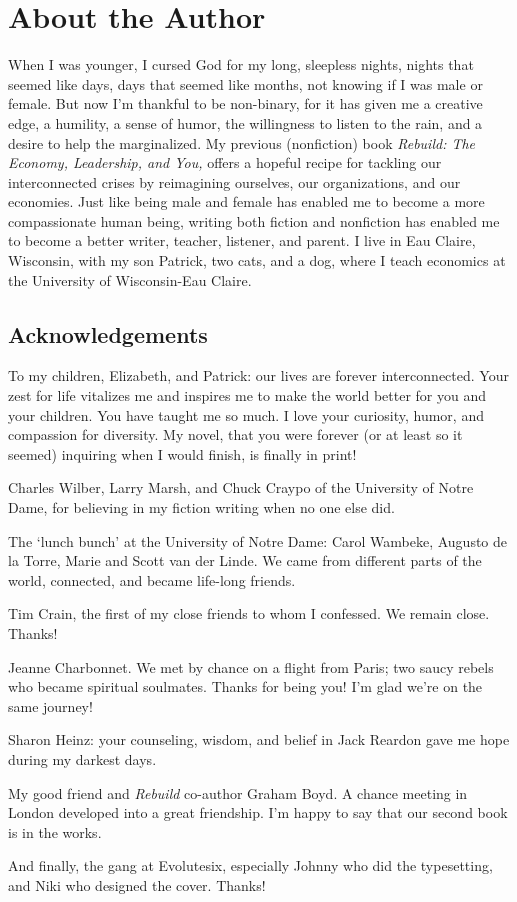 \chapter*{About the Author}

When I was younger, I cursed God for my long, sleepless nights, nights
that seemed like days, days that seemed like months, not knowing if I
was male or female. But now I'm thankful to be non-binary, for it has
given me a creative edge, a humility, a sense of humor, the willingness
to listen to the rain, and a desire to help the marginalized. My
previous (nonfiction) book \emph{Rebuild: The Economy, Leadership, and
You,} offers a hopeful recipe for tackling our interconnected crises by
reimagining ourselves, our organizations, and our economies. Just like
being male and female has enabled me to become a more compassionate
human being, writing both fiction and nonfiction has enabled me to
become a better writer, teacher, listener, and parent. I live in Eau
Claire, Wisconsin, with my son Patrick, two cats, and a dog, where I
teach economics at the University of Wisconsin-Eau Claire.

\section*{Acknowledgements}

To my children, Elizabeth, and Patrick: our lives are forever
interconnected. Your zest for life vitalizes me and inspires me to make
the world better for you and your children. You have taught me so much.
I love your curiosity, humor, and compassion for diversity. My novel,
that you were forever (or at least so it seemed) inquiring when I would
finish, is finally in print!

Charles Wilber, Larry Marsh, and Chuck Craypo of the University of Notre
Dame, for believing in my fiction writing when no one else did.

The `lunch bunch' at the University of Notre Dame: Carol Wambeke,
Augusto de la Torre, Marie and Scott van der Linde. We came from
different parts of the world, connected, and became life-long friends.

Tim Crain, the first of my close friends to whom I confessed. We remain
close. Thanks!

Jeanne Charbonnet. We met by chance on a flight from Paris; two saucy
rebels who became spiritual soulmates. Thanks for being you! I'm glad
we're on the same journey!

Sharon Heinz: your counseling, wisdom, and belief in Jack Reardon gave
me hope during my darkest days.

My good friend and \emph{Rebuild} co-author Graham Boyd. A chance
meeting in London developed into a great friendship. I'm happy to say
that our second book is in the works.

And finally, the gang at Evolutesix, especially Johnny who did the
typesetting, and Niki who designed the cover. Thanks!
